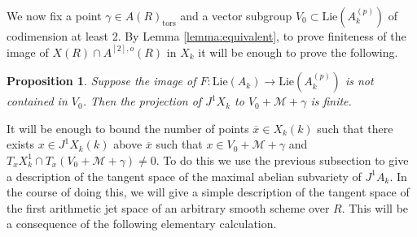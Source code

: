 \documentclass[11pt]{amsart}
\newcommand{\tors}{\mathrm{tors}}
\newcommand{\Lie}{\mathrm{Lie}}
\theoremstyle{plain}
\newtheorem{lemma}{Lemma}
\newtheorem{proposition}{Proposition}
\theoremstyle{definition}
\begin{document}
We now fix a point $\gamma \in A(R)_{\tors }$ and a vector subgroup $V_0 \subset \Lie (A_k ^{(p)})$ of codimension at least 2. By Lemma \ref{lemma:equivalent}, to prove finiteness of the image of $X(R)\cap A^{[2],o}(R)$ in $X_k$ it will be enough to prove the following.
\begin{proposition}\label{prop:finite}
Suppose the image of $F  :\Lie (A_k )\to \Lie (A_k ^{(p)})$ is not contained in $V_0 $. Then the projection of $J^1 X_k $ to $V_0 +\mathcal{M}+\gamma $ is finite.
\end{proposition}
It will be enough to bound the number of points $\overline{x}\in X_k (k)$ such that there exists $x \in J^1 X_k  (k)$ above $\overline{x}$ such that $x\in V_0 +\mathcal{M}+\gamma  $ and $T_x X_k ^1 \cap T_x (V_0 +\mathcal{M}+\gamma )\neq 0$. To do this we use the previous subsection to give a description of the tangent space of the maximal abelian subvariety of $J^1 A_k $. In the course of doing this, we will give a simple description of the tangent space of the first arithmetic jet space of an arbitrary smooth scheme over $R$. This will be a consequence of the following elementary calculation.
\end{document}
